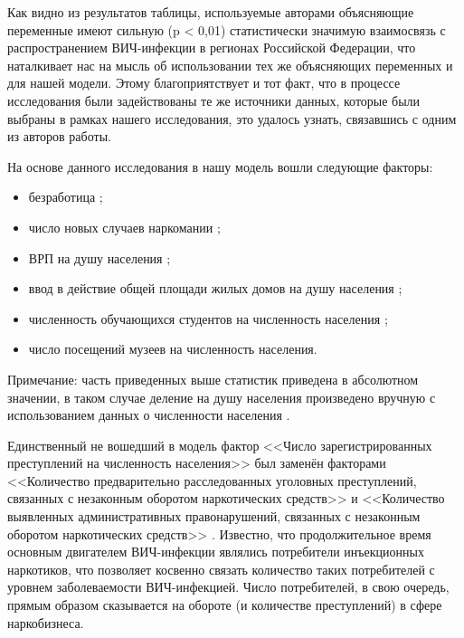     Как видно из результатов таблицы, используемые авторами объясняющие переменные имеют сильную (p < 0,01) статистически значимую взаимосвязь с распространением ВИЧ-инфекции в регионах Российской Федерации, что наталкивает нас на мысль об использовании тех же объясняющих переменных и для нашей модели. Этому благоприятствует и тот факт, что в процессе исследования были задействованы те же источники данных, которые были выбраны в рамках нашего исследования, это удалось узнать, связавшись с одним из авторов работы.

     На основе данного исследования в нашу модель вошли следующие факторы: 
     \begin{itemize}
         \item безработица \cite{bezrabotiza};
         \item число новых случаев наркомании \cite{new_narcomani_per_capita};
         \item ВРП на душу населения \cite{vrp_per_capita};
         \item ввод в действие общей площади жилых домов на душу населения \cite{new_houses_percent};
         \item численность обучающихся студентов на численность населения \cite{students_do_2012, students_posle_2012};
         \item число посещений музеев на численность населения\cite{museum_visits}.
          
     \end{itemize}

     Примечание: часть приведенных выше статистик приведена в абсолютном значении, в таком случае деление на душу населения произведено вручную с использованием данных о численности населения \cite{Chislennost_naselenia}.

     Единственный не вошедший в модель фактор <<Число зарегистрированных преступлений на численность населения>> был заменён факторами <<Количество предварительно расследованных уголовных преступлений, связанных с незаконным оборотом наркотических средств>> и <<Количество выявленных административных правонарушений, связанных с незаконным оборотом наркотических средств>> \cite{Ugol_do_2016, Ugol_posle_2016, Admin_do_2015, Admin_posle_2015}. Известно, что продолжительное время основным двигателем ВИЧ-инфекции являлись потребители инъекционных наркотиков, что позволяет косвенно связать количество таких потребителей с уровнем заболеваемости ВИЧ-инфекцией. Число потребителей, в свою очередь, прямым образом сказывается на обороте (и количестве преступлений) в сфере наркобизнеса. 

